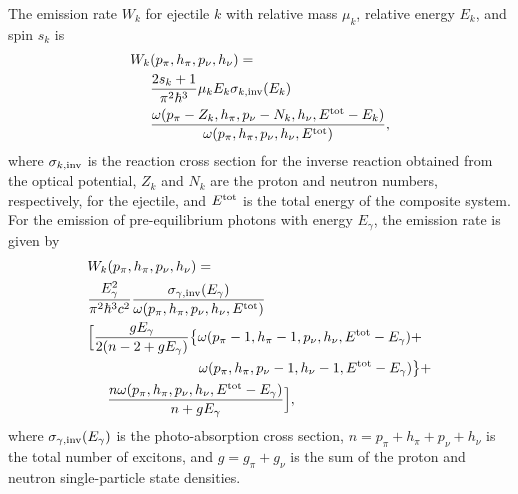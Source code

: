\documentclass[
10pt,
showpacs,preprintnumbers,footinbib,
amsfonts,amsmath,amssymb,
aps,
prc,twocolumn,groupedaddress,superscriptaddress,
showkeys,
nofootinbib
]{revtex4-1}
\begin{document}
The emission rate $W_k$ for ejectile $k$ with relative mass $\mu_k$, relative energy $E_k$, and spin $s_k$ is~\cite{Cline:1983,Dobes:1983}
\begin{align}
W_k&(p_\pi,h_\pi,p_\nu,h_\nu) = \notag \\
  & \frac{2s_k+1}{\pi^2\hbar^3} \mu_k E_k \sigma_{k,{\rm inv}}(E_k) \notag\\ 
  &\frac{\omega(p_\pi -Z_k,h_\pi,p_\nu-N_k,h_\nu,E^{\rm tot} - E_k)}
           {\omega(p_\pi,h_\pi,p_\nu,h_\nu,E^{\rm tot})},
     \label{eq:part-em-rate}
\end{align}
where $\sigma_{k,{\rm inv}}$ is the reaction cross section for the inverse reaction obtained from the optical potential, $Z_k$ and $N_k$ are the proton and neutron numbers, respectively, for the ejectile, and $E^{\rm tot}$ is the total energy of the composite system. For the emission of pre-equilibrium photons with energy $E_\gamma$, the emission rate is given by~\cite{Akkermans:1985}
\begin{align}
& W_k(p_\pi,h_\pi,p_\nu,h_\nu) = \notag \\
  & \frac{E_\gamma^2}{\pi^2\hbar^3c^2} \frac{\sigma_{\gamma,{\rm inv}}(E_\gamma)}{\omega(p_\pi,h_\pi,p_\nu,h_\nu,E^{\rm tot})} \notag \\ 
  & \Big [\frac{gE_\gamma}{2(n-2 +gE_\gamma)} \big \{\omega(p_\pi-1,h_\pi-1,p_\nu,h_\nu,E^{\rm tot}-E_\gamma)  +  \notag \\
  &\hskip 2.8 cm \omega(p_\pi,h_\pi,p_\nu-1,h_\nu-1,E^{\rm tot} - E_\gamma) \big \} + \notag \\
  & \hskip 0.5 cm \frac{n\omega(p_\pi,h_\pi,p_\nu,h_\nu,E^{\rm tot}-E_\gamma)}{n+gE_\gamma} \Big ],
     \label{eq:gam-em-rate}
\end{align}
where $\sigma_{\gamma,{\rm inv}}(E_\gamma)$ is the photo-absorption cross section, $n = p_\pi+h_\pi+p_\nu+h_\nu$ is the total number of excitons, and $g = g_\pi + g_\nu$ is the sum of the proton and neutron single-particle state densities.
\end{document}
